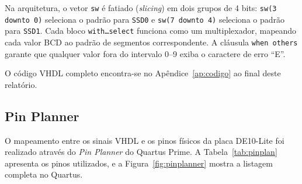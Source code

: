 \documentclass[12pt,a4paper, brazil]{article}
\begin{document}
Na arquitetura, o vetor \texttt{sw} é fatiado (\textit{slicing}) em dois grupos de 4 bits: \texttt{sw(3 downto 0)} seleciona o padrão para \texttt{SSD0} e \texttt{sw(7 downto 4)} seleciona o padrão para \texttt{SSD1}. Cada bloco \texttt{with\ldots select} funciona como um multiplexador, mapeando cada valor BCD ao padrão de segmentos correspondente. A cláusula \texttt{when others} garante que qualquer valor fora do intervalo 0--9 exiba o caractere de erro ``E''.

O código VHDL completo encontra-se no Apêndice~\ref{ap:codigo} ao final deste relatório.

\subsection{Pin Planner}

O mapeamento entre os sinais VHDL e os pinos físicos da placa DE10-Lite foi realizado através do \textit{Pin Planner} do Quartus Prime. A Tabela~\ref{tab:pinplan} apresenta os pinos utilizados, e a Figura~\ref{fig:pinplanner} mostra a listagem completa no Quartus.
\end{document}
